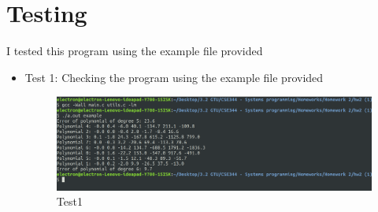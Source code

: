 \documentclass{article}
\begin{document}
\section{Testing}
I tested this program using the example file provided\\
\begin{itemize}
    \item 
    Test 1: Checking the program using the example file provided
        \begin{figure}[h!]
        \centering
        \includegraphics[scale=0.2]{test.png}
        \caption{Test1}
        \label{fig:universe}
        \end{figure}
\end{itemize}
\end{document}
